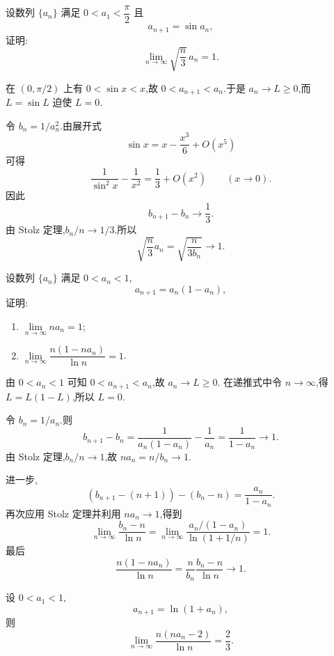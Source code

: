 \begin{example}
  设数列 $\{a_n\}$ 满足 $0<a_1<\dfrac{\pi}{2}$ 且
  \[
    a_{n+1}=\sin a_n,
  \]
  证明:
  \[
    \lim\limits_{n\to\infty}\sqrt{\dfrac{n}{3}}\,a_n=1.
  \]
\end{example}
\exampleblank

\begin{solution}
  在 $(0,\pi/2)$ 上有 $0<\sin x<x$,故 $0<a_{n+1}<a_n$.于是
  $a_n\to L\geq0$,而 $L=\sin L$ 迫使 $L=0$.

  令 $b_n=1/a_n^2$.由展开式
  \[
    \sin x=x-\dfrac{x^3}{6}+O(x^5)
  \]
  可得
  \[
    \dfrac{1}{\sin^2x}-\dfrac{1}{x^2}=\dfrac{1}{3}+O(x^2)
    \qquad(x\to0).
  \]
  因此
  \[
    b_{n+1}-b_n\longrightarrow\dfrac{1}{3}.
  \]
  由 Stolz 定理,$b_n/n\to1/3$.所以
  \[
    \sqrt{\dfrac{n}{3}}a_n
    =\sqrt{\dfrac{n}{3b_n}}\longrightarrow1.
  \]
\end{solution}

\begin{example}
  设数列 $\{a_n\}$ 满足 $0<a_n<1$,
  \[
    a_{n+1}=a_n(1-a_n),
  \]
  证明:
  \begin{enumerate}
    \item $\displaystyle \lim\limits_{n\to\infty}na_n=1$;
    \item $\displaystyle \lim\limits_{n\to\infty}\dfrac{n(1-na_n)}{\ln n}=1$.
  \end{enumerate}
\end{example}
\exampleblank

\begin{solution}
  由 $0<a_n<1$ 可知 $0<a_{n+1}<a_n$,故 $a_n\to L\geq0$.
  在递推式中令 $n\to\infty$,得 $L=L(1-L)$,所以 $L=0$.

  令 $b_n=1/a_n$.则
  \[
    b_{n+1}-b_n
    =\dfrac{1}{a_n(1-a_n)}-\dfrac{1}{a_n}
    =\dfrac{1}{1-a_n}\longrightarrow1.
  \]
  由 Stolz 定理,$b_n/n\to1$,故 $na_n=n/b_n\to1$.

  进一步,
  \[
    (b_{n+1}-(n+1))-(b_n-n)
    =\dfrac{a_n}{1-a_n}.
  \]
  再次应用 Stolz 定理并利用 $na_n\to1$,得到
  \[
    \lim\limits_{n\to\infty}\dfrac{b_n-n}{\ln n}
    =\lim\limits_{n\to\infty}
    \dfrac{a_n/(1-a_n)}{\ln(1+1/n)}=1.
  \]
  最后
  \[
    \dfrac{n(1-na_n)}{\ln n}
    =\dfrac{n}{b_n}\dfrac{b_n-n}{\ln n}\longrightarrow1.
  \]
\end{solution}

\begin{example}
  设 $0<a_1<1$,
  \[
    a_{n+1}=\ln(1+a_n),
  \]
  则
  \[
    \lim\limits_{n\to\infty}\dfrac{n(na_n-2)}{\ln n}=\dfrac{2}{3}.
  \]
\end{example}
\exampleblank

